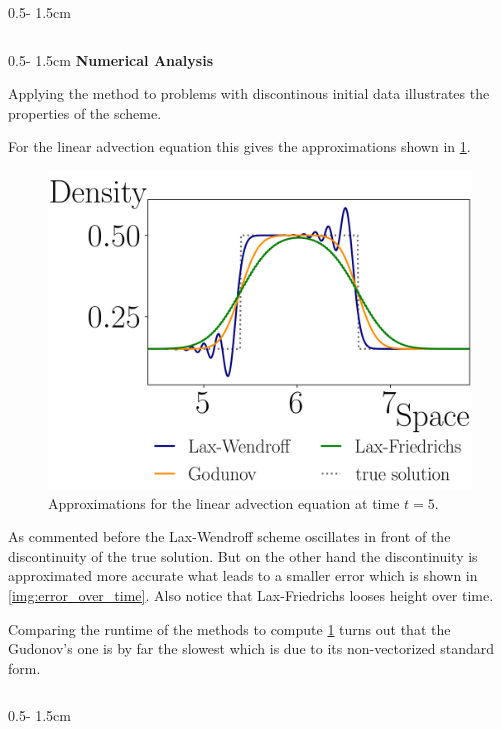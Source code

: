 \documentclass{uibposter}
\begin{document}
\begin{frame}[fragile]
\begin{columns}
\begin{column}{0.5\textwidth - 1.5cm}
\begin{column}{0.5\textwidth - 1.5cm}
\vspace{0.5cm}
\textbf{Numerical Analysis}
\vspace{0.5cm}
    
Applying the method to problems with discontinous initial data illustrates the properties of the scheme.

\vspace{0.5cm}
For the linear advection equation this gives the approximations shown in \cref{img:linar_comprehension}. 

\begin{figure}[h]
	\includegraphics{fig/linear_compare.png}
	\caption{Approximations for the linear advection equation at time $t = 5$.}
	\label{img:linar_comprehension}
\end{figure}

As commented before the Lax-Wendroff scheme oscillates in front of the discontinuity of the true solution. But on the other hand the discontinuity is approximated more accurate what leads to a smaller error which is shown in \cref{img:error_over_time}. Also notice that Lax-Friedrichs looses height over time. 

\vspace{0.5cm}
Comparing the runtime of the methods to compute \cref{img:linar_comprehension} turns out that the Gudonov's one is by far the slowest which is due to its non-vectorized standard form.

\end{column}
\begin{column}{0.5\textwidth - 1.5cm}
	\vspace*{-1.7cm} 
	

\end{column}
\end{column}
\end{columns}
\end{frame}
\end{document}
